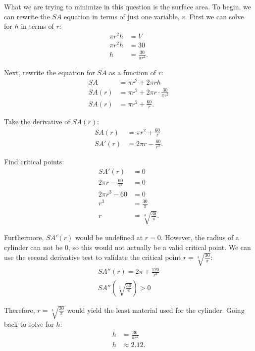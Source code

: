 \documentclass[12pt]{article}
\begin{document}
\begin{enumerate}
	What we are trying to minimize in this question is the surface area. To begin, we can rewrite the $SA$ equation in terms of just one variable, $r$. First we can solve for $h$ in terms of $r$:
	\begin{align*}
		\pi r^2 h &= V \\
		\pi r^2 h &= 30 \\
		h &= \frac{30}{\pi r^2}.
	\end{align*}

	Next, rewrite the equation for $SA$ as a function of $r$:
	\begin{align*}
		SA &= \pi r^2 + 2 \pi r h \\
		SA(r) &= \pi r^2 + 2 \pi r \cdot \frac{30}{\pi r^2} \\[5pt]
		SA(r) &= \pi r^2 + \frac{60}{r}.
	\end{align*}

	Take the derivative of $SA(r)$:
	\begin{align*}
		SA(r) &= \pi r^2 + \frac{60}{r} \\[5pt]
		SA'(r) &= 2 \pi r - \frac{60}{r^2}.
	\end{align*}

	Find critical points:
	\begin{align*}
		SA'(r) &= 0 \\
		2 \pi r - \frac{60}{r^2} &= 0 \\
		2 \pi r^3 - 60 &= 0 \\
		r^3 &= \frac{30}{\pi} \\
		r &= \sqrt[3]{\frac{30}{\pi}}.
	\end{align*}

	Furthermore, $SA'(r)$ would be undefined at $r = 0$. However, the radius of a cylinder can not be $0$, so this would not actually be a valid critical point. We can use the second derivative test to validate the critical point $r = \sqrt[3]{\frac{30}{\pi}}$:
	\begin{gather*}
		SA''(r) = 2 \pi + \frac{120}{r^3} \\[5pt]
		SA'' \left( \sqrt[3]{\frac{30}{\pi}} \right) > 0
	\end{gather*}

	Therefore, $r = \sqrt[3]{\frac{30}{\pi}}$ would yield the least material used for the cylinder. Going back to solve for $h$:
	\begin{align*}
		h &= \frac{30}{\pi r^2} \\
		h &\approx 2.12.
	\end{align*}
\end{enumerate}
\end{document}
